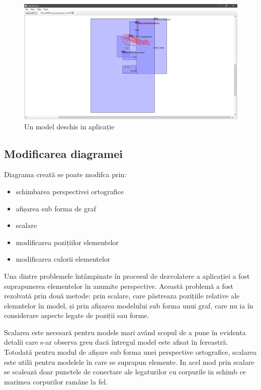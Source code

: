 \begin{figure}[h]
    \includegraphics[width=\linewidth]{imagini/implementare/tabs.png}
    \caption{Un model deschis in aplicație}
    \label{fig:tabs}
\end{figure}

\subsection{Modificarea diagramei}
Diagrama creată se poate modifca prin:
\begin{itemize}
    \item schimbarea perspectivei ortografice
    \item afișarea sub forma de graf
    \item scalare
    \item modificarea pozițiilor elementelor
    \item modificarea culorii elementelor
\end{itemize}

Una dintre problemele întâmpinate în procesul de dezvolatere a aplicației a fost suprapunerea elementelor în anumite perspective. 
Această problemă a fost rezolvată prin două metode: prin scalare, care păstreaza pozițiile relative ale elemntelor în model, și prin afișarea 
modelului sub forma unui graf, care nu ia în considerare aspecte legate de poziții sau forme.\newline

Scalarea este necesară pentru modele mari având scopul de a pune în evidenta detalii care s-ar observa greu dacă întregul model este afisat în fereastră. 
Totodată pentru modul de afișare sub forma unei perspective ortografice, scalarea este utilă
pentru modelele în care se suprapun elemente. In acel mod prin scalare se scalează doar punctele de conectare ale legaturilor cu corpurile in schimb ce marimea 
corpurilor ramâne la fel.\newline

